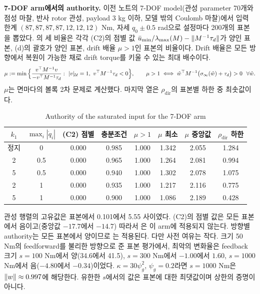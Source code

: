 \documentclass[11pt]{article}\usepackage[margin=1in]{geometry}\usepackage{amsmath,amssymb,amsthm,mathtools}\usepackage{graphicx}\graphicspath{{figures/}{../figures/}{figs/}{./}}\usepackage{enumitem}\usepackage{hyperref}\usepackage{cleveref}\usepackage{tikz}\usetikzlibrary{arrows.meta,positioning,calc,shapes.geometric}\usepackage{float}\usepackage[most]{tcolorbox}\usepackage{kotex}\usepackage{booktabs}\emergencystretch=1.6em\tolerance=2000 \crefname{assumption}{Assumption}{Assumptions}\Crefname{assumption}{Assumption}{Assumptions}\crefname{definition}{Definition}{Definitions}\Crefname{definition}{Definition}{Definitions}\crefname{proposition}{Proposition}{Propositions}\Crefname{proposition}{Proposition}{Propositions}\crefname{fact}{Fact}{Facts}\Crefname{fact}{Fact}{Facts} \newtheorem{assumption}{Assumption}\newtheorem{definition}{Definition}\newtheorem{lemma}{Lemma}\newtheorem{proposition}{Proposition}\newtheorem{theorem}{Theorem}\newtheorem{corollary}{Corollary}\newtheorem{fact}{Fact}\theoremstyle{remark}\newtheorem{remark}{Remark} \newcommand{\R}{\mathbb{R}}\newcommand{\U}{\mathcal U}
\begin{document}
\textbf{7-DOF arm에서의 authority.} 이전 노트의 7-DOF model(관성 parameter 70개와 점성 마찰, 반사 rotor 관성, payload 3 kg 이하, 모델 밖의 Coulomb 마찰)에서 입력 한계 $(87,87,87,87,12,12,12)$ Nm, 자세 $q_0\pm0.5$ rad으로 설정마다 200개의 표본을 뽑았다. 의 세 비율은 각각 (C2)의 점별 값 $\bar u_{\min}/\lambda_{\max}(M)-\lVert M^{-1}\tau_d\rVert$가 양인 표본, (d)의 괄호가 양인 표본, drift 배율 $\mu>1$인 표본의 비율이다. Drift 배율은 모든 방향에서 복원이 가능한 채로 drift torque를 키울 수 있는 최대 배수이다.
\[
\mu:=\min\Big\{\frac{v^\top M^{-1}v}{-v^\top M^{-1}\tau_d}:\ |v|_{\U}=1,\ v^\top M^{-1}\tau_d<0\Big\},\qquad \mu>1\iff\what^\top M^{-1}\big(\sigma_\infty(\what)+\tau_d\big)>0\ \ \forall\what .
\]
$\mu$는 면마다의 볼록 2차 문제로 계산했다. 마지막 열은 $\rho_{\mathrm{dir}}$의 표본별 하한 중 최솟값이다.

\begin{table}[H]
\centering\footnotesize\setlength{\tabcolsep}{4pt}
\caption{Authority of the saturated input for the 7-DOF arm}
\label{tab:panda}
\begin{tabular}{cccccccc}
\toprule
$k_1$ & $\max_i|\dot q_i|$ & (C2) 점별 & 충분조건 & $\mu>1$ & $\mu$ 최소 & $\mu$ 중앙값 & $\rho_{\mathrm{dir}}$ 하한 \\
\midrule
정지 & 0 & 0.000 & 0.985 & 1.000 & 1.342 & 2.055 & 1.284 \\
2 & 0.5 & 0.000 & 0.965 & 1.000 & 1.264 & 2.081 & 0.994 \\
5 & 0.5 & 0.000 & 0.940 & 1.000 & 1.302 & 2.078 & 1.075 \\
2 & 1 & 0.000 & 0.935 & 1.000 & 1.217 & 2.116 & 0.775 \\
5 & 1 & 0.000 & 0.900 & 1.000 & 1.086 & 2.189 & 0.428 \\
\bottomrule
\end{tabular}
\end{table}

관성 행렬의 고유값은 표본에서 0.101에서 5.55 사이였다. (C2)의 점별 값은 모든 표본에서 음이고(중앙값 $-17.7$에서 $-14.7$) 따라서 은 이 arm에 적용되지 않는다. 방향별 authority는 모든 표본에서 양이므로 는 적용된다. 다만 사전 여유는 작다. 크기 50 Nm의 feedforward를 불리한 방향으로 준 표본 평가에서, 최악의 변화율은 feedback 크기 $s=100$ Nm에서 양(34.6에서 41.5), $s=300$ Nm에서 $-1.00$에서 $1.60$, $s=1000$ Nm에서 음($-4.80$에서 $-0.34$)이었다. $\kappa=30\psi_g^2$, $\psi_g=0.2$라면 $s=1000$ Nm은 $\lVert w\rVert\approx0.997$에 해당한다. 유한한 $s$에서의 값은 표본에 대한 최댓값이며 상한의 증명이 아니다.
\end{document}
